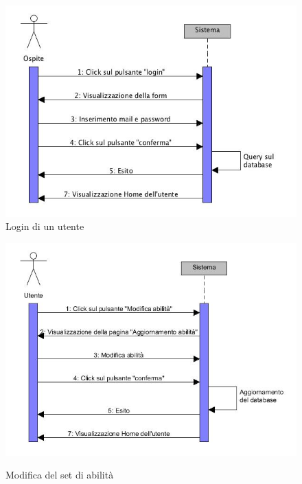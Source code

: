 \documentclass[a4paper,12pt]{article}
\begin{document}
\begin{figure}
\centering
\includegraphics[scale=0.70]{sDiagrams/login.jpg} \\
\caption{\label{login} Login di un utente}
\vspace{0.5cm}
\includegraphics[scale=0.70]{sDiagrams/modificaAbilita.jpg} \\
\caption{\label{modificaAbilita} Modifica del set di abilità}
\end{figure}
\clearpage
\end{document}
